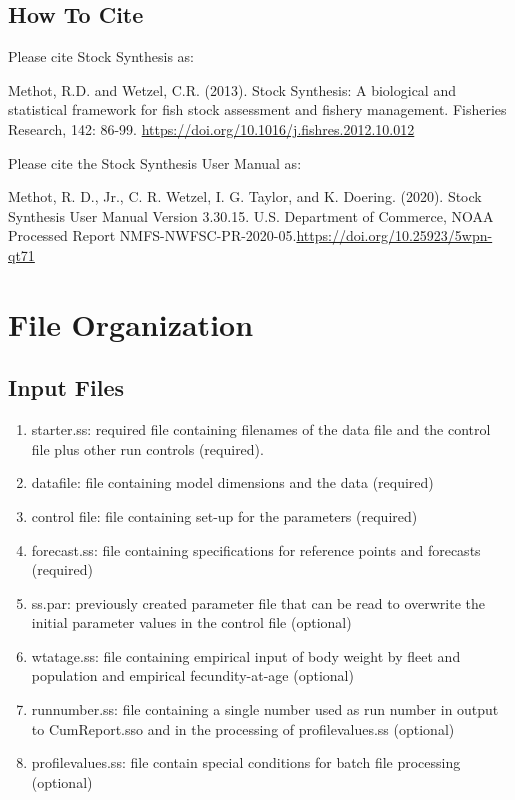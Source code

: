   \subsection{How To Cite}
  
Please cite Stock Synthesis as:

Methot, R.D. and Wetzel, C.R. (2013). Stock Synthesis: A biological and statistical
framework for fish stock assessment and fishery management. Fisheries Research, 
142: 86-99. \href{https://doi.org/10.1016/j.fishres.2012.10.012}{https://doi.org/10.1016/j.fishres.2012.10.012}

Please cite the Stock Synthesis User Manual as:

Methot, R. D., Jr., C. R. Wetzel, I. G. Taylor, and K. Doering. (2020). Stock Synthesis User Manual Version 3.30.15. U.S. Department of Commerce, NOAA Processed Report NMFS-NWFSC-PR-2020-05.\href{https://doi.org/10.25923/5wpn-qt71}{https://doi.org/10.25923/5wpn-qt71}

\pagebreak
		
\section{File Organization}\label{FileOrganization}		
	\subsection{Input Files}
	\begin{enumerate}
		\item starter.ss: required file containing filenames of the data file and the control file plus other run controls (required).
		\item datafile: file containing model dimensions and the data (required)
		\item control file: file containing set-up for the parameters (required)
		\item forecast.ss: file containing specifications for reference points and forecasts (required) 
		\item ss.par: previously created parameter file that can be read to overwrite the initial parameter values in the control file (optional)
		\item wtatage.ss: file containing empirical input of body weight by fleet and population and empirical fecundity-at-age (optional)
		\item runnumber.ss: file containing a single number used as run number in output to CumReport.sso and in the processing of profilevalues.ss (optional)
		\item profilevalues.ss: file contain special conditions for batch file processing (optional)
	\end{enumerate}
	
